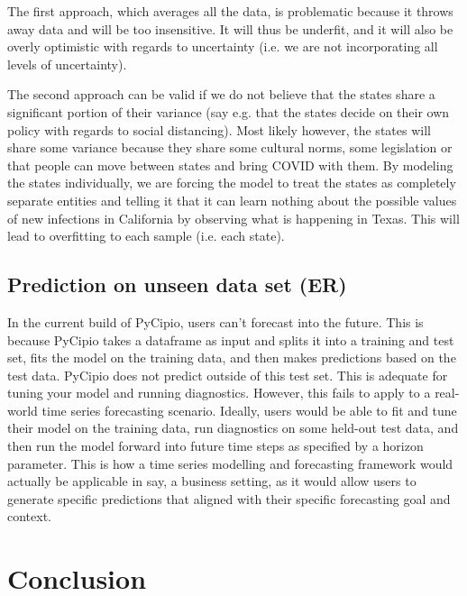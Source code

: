 \documentclass{article}
\begin{document}
\noindent The first approach, which averages all the data, is problematic because it throws away data and will be too insensitive. It will thus be underfit, and it will also be overly optimistic with regards to uncertainty (i.e. we are not incorporating all levels of uncertainty).

\noindent The second approach can be valid if we do not believe that the states share a significant portion of their variance (say e.g. that the states decide on their own policy with regards to social distancing). Most likely however, the states will share some variance because they share some cultural norms, some legislation or that people can move between states and bring COVID with them. By modeling the states individually, we are forcing the model to treat the states as completely separate entities and telling it that it can learn nothing about the possible values of new infections in California by observing what is happening in Texas. This will lead to overfitting to each sample (i.e. each state).

\subsection{Prediction on unseen data set (ER)}

\noindent In the current build of PyCipio, users can't forecast into the future. This is because PyCipio takes a dataframe as input and splits it into a training and test set, fits the model on the training data, and then makes predictions based on the test data. PyCipio does not predict outside of this test set. This is adequate for tuning your model and running diagnostics. However, this fails to apply to a real-world time series forecasting scenario. Ideally, users would be able to fit and tune their model on the training data, run diagnostics on some held-out test data, and then run the model forward into future time steps as specified by a horizon parameter. This is how a time series modelling and forecasting framework would actually be applicable in say, a business setting, as it would allow users to generate specific predictions that aligned with their specific forecasting goal and context.

\section{Conclusion}
\end{document}
